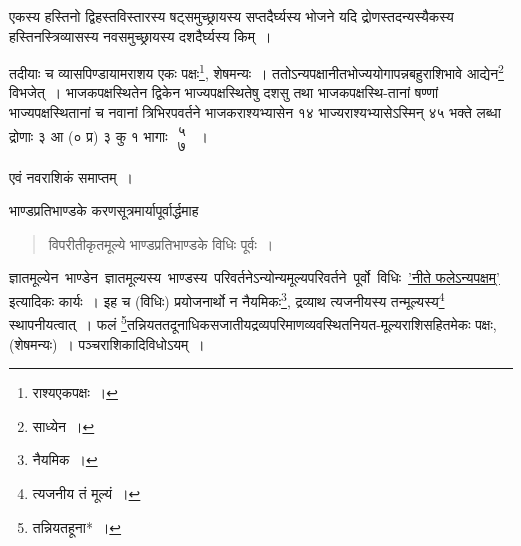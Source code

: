 \documentclass[10pt, openany]{book}
\begin{document}
{{{एकस्य हस्तिनो द्विहस्तविस्तारस्य षट्समुच्छ्रायस्य सप्तदैर्घ्यस्य भोजने
यदि द्रोणस्तदन्यस्यैकस्य हस्तिनस्त्रिव्यासस्य नवसमुच्छ्रायस्य दशदैर्घ्यस्य किम्~।}

{तदीयाः च व्यासपिण्डायामराशय एकः पक्षः\renewcommand{\thefootnote}{\s ९}\footnote{\s राश्यएकपक्षः~।}, शेषमन्यः~।
ततोऽन्यपक्षानीतभोज्ययोगापन्नबहुराशिभावे आद्येन\renewcommand{\thefootnote}{\s १०}\footnote{\s साध्येन~।} विभजेत्~। भाजकपक्षस्थितेन द्विकेन
भाज्यपक्षस्थितेषु दशसु तथा}
{भाजकपक्षस्थि-तानां षण्णां भाज्यपक्षस्थितानां च नवानां त्रिभिरपवर्तने
भाजकराश्यभ्यासेन}
{१४ भाज्यराश्यभ्यासेऽस्मिन् ४५ भक्ते लब्धा द्रोणाः ३ आ (० प्र) ३ कु १
भागाः $\begin{matrix}

\mbox{{५}}\\

\mbox{{७}}

\end{matrix}$~।}

\begin{center}{एवं नवराशिकं समाप्तम्~।}\end{center}


\newpage

{भाण्डप्रतिभाण्डके करणसूत्रमार्यापूर्वार्द्धमाह\textemdash}

 \label{46.1}
\begin{quote}{\bs विपरीतीकृतमूल्ये भाण्डप्रतिभाण्डके विधिः पूर्वः~।}\end{quote}

{ज्ञातमूल्येन \,भाण्डेन \,ज्ञातमूल्यस्य \,भाण्डस्य \,परिवर्तनेऽन्योन्यमूल्यपरिवर्तने \,पूर्वो \,विधिः \,\hyperref[45]{'नीते फलेऽन्यपक्षम्'} इत्यादिकः कार्यः~। इह च (विधिः) प्रयोजनार्थो न
नैयमिकः\renewcommand{\thefootnote}{\s १}\footnote{\s नैयमिक~।}, द्रव्याथ}
{त्यजनीयस्य तन्मूल्यस्य\renewcommand{\thefootnote}{\s २}\footnote{\s त्यजनीय तं मूल्यं~।} स्थापनीयत्वात्~। फलं
\renewcommand{\thefootnote}{\s ३}\footnote{\s तन्नियतहूना*~।}तन्नियततदूनाधिकसजातीयद्रव्यपरिमाणव्यवस्थितनियत-मूल्यराशिसहितमेकः
पक्षः, (शेषमन्यः)~। पञ्चराशिकादिविधोऽयम्~।}

\vspace{0.3cm}{उदाहरणम्\textemdash}

}}
\end{document}
